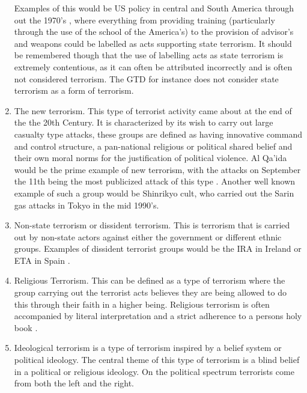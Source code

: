 \begin{enumerate}
Examples of this would be US policy in central and South America through out the 1970's \citep{gareau2004state}, where everything from providing training (particularly through the use of the school of the America's) to the provision of advisor's and weapons \citep{koonings1999societies} could be labelled as acts supporting state terrorism. It should be remembered though that the use of labelling acts as state terrorism is extremely contentious, as it can often be attributed incorrectly and is often not considered terrorism. The GTD for instance does not consider state terrorism as a form of terrorism.
\item The new terrorism. This type of terrorist activity came about at the end of the the 20th Century. It is characterized by its wish to carry out large casualty type attacks, these groups are defined as having innovative command and control structure, a pan-national religious or political shared belief and their own moral norms for the justification of political violence. Al Qa'ida would be the prime example of new terrorism, with the attacks on September the 11th being the most publicized attack of this type \citep{burke2004qaeda}. Another well known example of such a group would be Shinrikyo cult, \citep{morgan2004origins} who carried out the Sarin gas attacks in Tokyo in the mid 1990's.
\item  Non-state terrorism or dissident terrorism. This is terrorism that is carried out by non-state actors against either the government or different ethnic groups. Examples of dissident terrorist groups would be the IRA in Ireland or ETA in Spain \citep{lutz2009successful}.
\item  Religious Terrorism. This can be defined as a type of terrorism where the group carrying out the terrorist acts believes they are being  allowed to do this through their faith in a higher being. Religious terrorism is often accompanied by literal interpretation and a strict adherence to a persons holy book \citep{pratt2015terrorism}.
\item Ideological terrorism is a type of terrorism inspired by a belief system or political ideology. The central theme of this type of terrorism is a blind belief in a political or religious ideology. On the political spectrum terrorists come from both the left and the right.

\end{enumerate}
